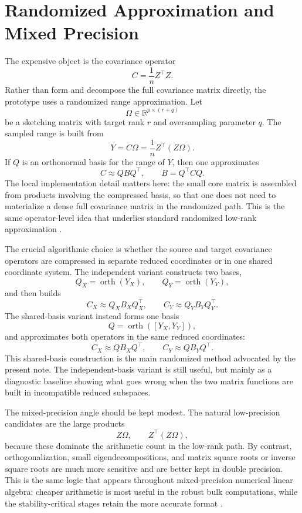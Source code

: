 \section{Randomized Approximation and Mixed Precision}

The expensive object is the covariance operator
\[
	C = \frac{1}{n} Z^\top Z.
\]
Rather than form and decompose the full covariance matrix directly, the prototype uses a randomized range approximation. Let
\[
	\Omega \in \mathbb{R}^{p \times (r+q)}
\]
be a sketching matrix with target rank $r$ and oversampling parameter $q$. The sampled range is built from
\[
	Y = C\Omega = \frac{1}{n} Z^\top(Z\Omega).
\]
If $Q$ is an orthonormal basis for the range of $Y$, then one approximates
\[
	C \approx QBQ^\top,
	\qquad
	B = Q^\top C Q.
\]
The local implementation detail matters here: the small core matrix is assembled from products involving the compressed basis, so that one does not need to materialize a dense full covariance matrix in the randomized path. This is the same operator-level idea that underlies standard randomized low-rank approximation \autocite{halko2011finding,martinsson2020randnla}.

The crucial algorithmic choice is whether the source and target covariance operators are compressed in separate reduced coordinates or in one shared coordinate system. The independent variant constructs two bases,
\[
	Q_X = \operatorname{orth}(Y_X),
	\qquad
	Q_Y = \operatorname{orth}(Y_Y),
\]
and then builds
\[
	C_X \approx Q_X B_X Q_X^\top,
	\qquad
	C_Y \approx Q_Y B_Y Q_Y^\top.
\]
The shared-basis variant instead forms one basis
\[
	Q = \operatorname{orth}([Y_X, Y_Y]),
\]
and approximates both operators in the same reduced coordinates:
\[
	C_X \approx Q B_X Q^\top,
	\qquad
	C_Y \approx Q B_Y Q^\top.
\]
This shared-basis construction is the main randomized method advocated by the present note. The independent-basis variant is still useful, but mainly as a diagnostic baseline showing what goes wrong when the two matrix functions are built in incompatible reduced subspaces.

The mixed-precision angle should be kept modest. The natural low-precision candidates are the large products
\[
	Z\Omega, \qquad Z^\top(Z\Omega),
\]
because these dominate the arithmetic count in the low-rank path. By contrast, orthogonalization, small eigendecompositions, and matrix square roots or inverse square roots are much more sensitive and are better kept in double precision. This is the same logic that appears throughout mixed-precision numerical linear algebra: cheaper arithmetic is most useful in the robust bulk computations, while the stability-critical stages retain the more accurate format \autocite{higham2022mixed}.

